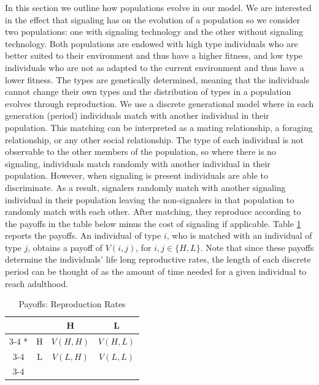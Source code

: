 In this section we outline how populations evolve in our model. We are interested in the effect that signaling has on the evolution of a population so we consider two populations: one with signaling technology and the other without signaling technology. Both populations are endowed with high type individuals who are better suited to their environment and thus have a higher fitness, and low type individuals who are not as adapted to the current environment and thus have a lower fitness. The types are genetically determined, meaning that the individuals cannot change their own types and the distribution of types in a population evolves through reproduction. We use a discrete generational model where in each generation (period) individuals match with another individual in their population. This matching can be interpreted as a mating relationship, a foraging relationship, or any other social relationship. The type of each individual is not observable to the other members of the population, so where there is no signaling, individuals match randomly with another individual in their population. However, when signaling is present individuals are able to discriminate. As a result, signalers randomly match with another signaling individual in their population leaving the non-signalers in that population to randomly match with each other. After matching, they reproduce according to the payoffs in the table below minus the cost of signaling if applicable. Table \ref{tab:payofftable} reports the payoffs. An individual of type $i$, who is matched with an individual of type $j$, obtains a payoff of $V(i, j)$, for $i, j \in \{H, L\}$.  %
Note that since these payoffs determine the individuals' life long reproductive rates, the length of each discrete period can be thought of as the amount of time needed for a given individual to reach adulthood.

\begin{table}[!ht]
\caption{Payoffs: Reproduction Rates}
\label{tab:payofftable}
\centering
\vskip6pt
 \begin{tabular}{cc|c|c|} 
    
      & \multicolumn{1}{c}{} & \multicolumn{1}{c}{H}  & \multicolumn{1}{c}{L} \\\cline{3-4}
      \multirow{2}*{}  & H & $V(H,H)$ & $V(H,L)$ \\\cline{3-4}
      & L & $V(L,H)$ & $V(L,L)$ \\\cline{3-4}
    \end{tabular}
    \vskip6pt
\end{table}

